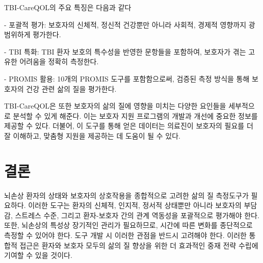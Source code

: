 \documentclass{article}
\begin{document}
TBI-CareQOL의 주요 특징은 다음과 같다

- 포괄적 평가: 보호자의 신체적, 정신적 건강뿐만 아니라 사회적, 경제적 영향까지 광범위하게 평가한다.

- TBI 특화: TBI 환자 보호의 특수성을 반영한 문항들을 포함하여, 보호자가 겪는 고유한 어려움을 정확히 측정한다.

- PROMIS 활용: 10개의 PROMIS 도구를 포함함으로써, 검증된 측정 방식을 통해 보호자의 건강 관련 삶의 질을 평가한다.

TBI-CareQOL은 또한 보호자의 삶의 질에 영향을 미치는 다양한 요인들을 세부적으로 분석할 수 있게 해준다. 이는 보호자 지원 프로그램의 개발과 개선에 중요한 정보를 제공할 수 있다. 더불어, 이 도구를 통해 얻은 데이터는 의료진이 보호자의 필요를 더 잘 이해하고, 맞춤형 지원을 제공하는 데 도움이 될 수 있다.

\section{결론}
뇌손상 환자의 상태와 보호자의 상호작용을 종합적으로 고려한 삶의 질 측정도구가 필요하다. 이러한 도구는 환자의 신체적, 인지적, 정서적 상태뿐만 아니라 보호자의 부담감, 스트레스 수준, 그리고 환자-보호자 간의 관계 역동성을 포괄적으로 평가해야 한다. 또한, 뇌손상의 특성상 장기적인 관리가 필요하므로, 시간에 따른 변화를 종단적으로 측정할 수 있어야 한다. 도구 개발 시 이러한 관점을 반드시 고려해야 한다. 이러한 통합적 접근은 환자와 보호자 모두의 삶의 질 향상을 위한 더 효과적인 중재 전략 수립에 기여할 수 있을 것이다.


\end{document}
